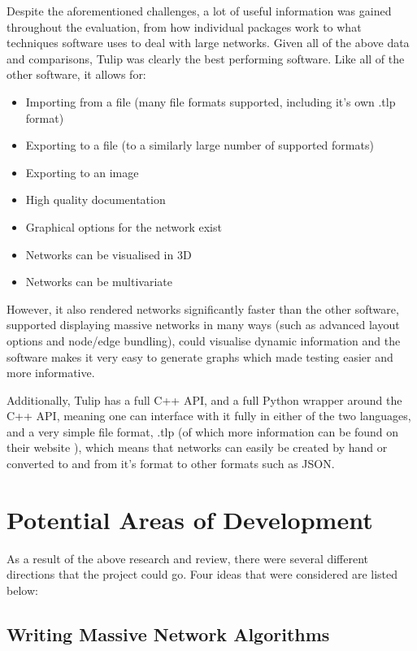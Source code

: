 \documentclass[../dissertation.tex]{subfiles}
\begin{document}
Despite the aforementioned challenges, a lot of useful information was gained throughout the evaluation, from how individual packages work to what techniques software uses to deal with large networks. Given all of the above data and comparisons, Tulip was clearly the best performing software. Like all of the other software, it allows for:
\begin{itemize}
    \item Importing from a file (many file formats supported, including it's own .tlp format)
    \item Exporting to a file (to a similarly large number of supported formats)
    \item Exporting to an image
    \item High quality documentation
    \item Graphical options for the network exist
    \item Networks can be visualised in 3D
    \item Networks can be multivariate
\end{itemize}

However, it also rendered networks significantly faster than the other software, supported displaying massive networks in many ways (such as advanced layout options and node/edge bundling), could visualise dynamic information and the software makes it very easy to generate graphs which made testing easier and more informative. 

Additionally, Tulip has a full C++ API, and a full Python wrapper around the C++ API, meaning one can interface with it fully in either of the two languages, and a very simple file format, .tlp (of which more information can be found on their website \cite{tuliptlp}), which means that networks can easily be created by hand or converted to and from it's format to other formats such as JSON.

\section{Potential Areas of Development}

As a result of the above research and review, there were several different directions that the project could go. Four ideas that were considered are listed below:

\subsection{Writing Massive Network Algorithms}
\end{document}
